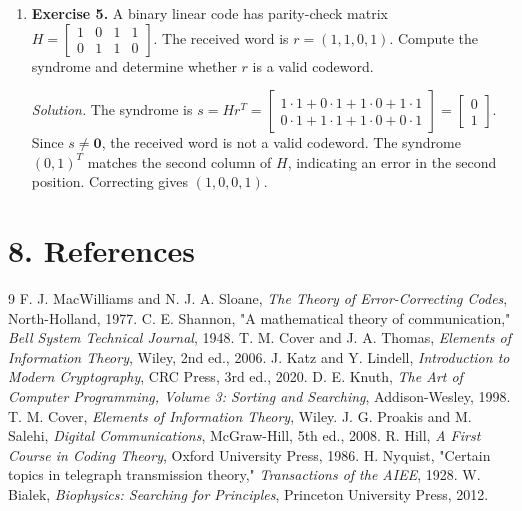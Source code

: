 \begin{enumerate}[leftmargin=*,itemsep=0.9em]
\emph{Solution.} The Singleton bound states $d\leq n-k+1$. For $n=15$, $k=9$: $d\leq 15-9+1=7$. Reed--Solomon codes are maximum-distance separable (MDS), so they achieve $d=n-k+1=7$.

\item \textbf{Exercise 5.} A binary linear code has parity-check matrix $H=\begin{bmatrix}1&0&1&1\\0&1&1&0\end{bmatrix}$. The received word is $r=(1,1,0,1)$. Compute the syndrome and determine whether $r$ is a valid codeword.

\emph{Solution.} The syndrome is $s=Hr^T=\begin{bmatrix}1\cdot1+0\cdot1+1\cdot0+1\cdot1\\0\cdot1+1\cdot1+1\cdot0+0\cdot1\end{bmatrix}=\begin{bmatrix}0\\1\end{bmatrix}$. Since $s\neq\mathbf{0}$, the received word is not a valid codeword. The syndrome $(0,1)^T$ matches the second column of $H$, indicating an error in the second position. Correcting gives $(1,0,0,1)$.

\end{enumerate}
\section*{8. References}


\begin{thebibliography}{9}
 F. J. MacWilliams and N. J. A. Sloane, \emph{The Theory of Error-Correcting Codes}, North-Holland, 1977.
 C. E. Shannon, "A mathematical theory of communication," \emph{Bell System Technical Journal}, 1948.
 T. M. Cover and J. A. Thomas, \emph{Elements of Information Theory}, Wiley, 2nd ed., 2006.
 J. Katz and Y. Lindell, \emph{Introduction to Modern Cryptography}, CRC Press, 3rd ed., 2020.
 D. E. Knuth, \emph{The Art of Computer Programming, Volume 3: Sorting and Searching}, Addison-Wesley, 1998.
 T. M. Cover, \emph{Elements of Information Theory}, Wiley.
 J. G. Proakis and M. Salehi, \emph{Digital Communications}, McGraw-Hill, 5th ed., 2008.
 R. Hill, \emph{A First Course in Coding Theory}, Oxford University Press, 1986.
 H. Nyquist, "Certain topics in telegraph transmission theory," \emph{Transactions of the AIEE}, 1928.
 W. Bialek, \emph{Biophysics: Searching for Principles}, Princeton University Press, 2012.
\end{thebibliography}

